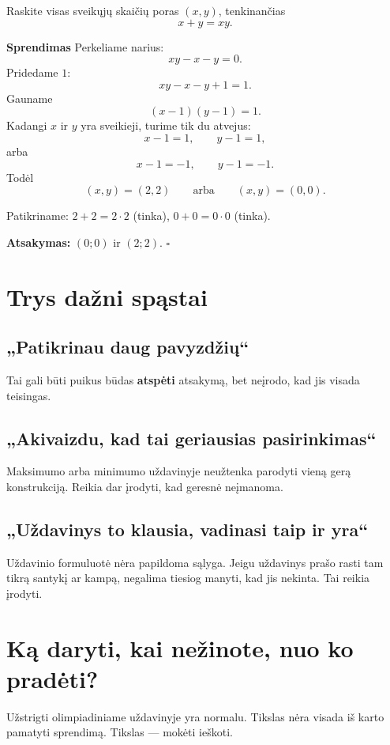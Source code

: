 \documentclass[11pt,a4paper]{scrartcl}
\newenvironment{solution}
    {\begin{list}{}{\setlength{\leftmargin}{10pt}\setlength{\rightmargin}{10pt}}\item[]}
    {\end{list}}
\begin{document}
\begin{example}
Raskite visas sveikųjų skaičių poras $(x,y)$, tenkinančias
\[
x+y=xy.
\]
\end{example}

\begin{solution}
\textbf{Sprendimas}
Perkeliame narius:
\[
xy-x-y=0.
\]
Pridedame $1$:
\[
xy-x-y+1=1.
\]
Gauname
\[
(x-1)(y-1)=1.
\]
Kadangi $x$ ir $y$ yra sveikieji, turime tik du atvejus:
\[
x-1=1,\qquad y-1=1,
\]
arba
\[
x-1=-1,\qquad y-1=-1.
\]
Todėl
\[
(x,y)=(2,2) \qquad\text{arba}\qquad (x,y)=(0,0).
\]

Patikriname: 
$2+2=2\cdot 2$ (tinka), $0+0=0\cdot 0$ (tinka).

\textbf{Atsakymas:} $\boxed{(0;0) \text{ ir } (2;2)}$. \hfill $\square$
\end{solution}

\section{Trys dažni spąstai}

\subsection{„Patikrinau daug pavyzdžių“}
Tai gali būti puikus būdas \textbf{atspėti} atsakymą, bet neįrodo, kad
jis visada teisingas.

\subsection{„Akivaizdu, kad tai geriausias pasirinkimas“}
Maksimumo arba minimumo uždavinyje neužtenka parodyti vieną gerą
konstrukciją. Reikia dar įrodyti, kad geresnė neįmanoma.

\subsection{„Uždavinys to klausia, vadinasi taip ir yra“}
Uždavinio formuluotė nėra papildoma sąlyga. Jeigu uždavinys prašo rasti
tam tikrą santykį ar kampą, negalima tiesiog manyti, kad jis nekinta.
Tai reikia įrodyti.

\section{Ką daryti, kai nežinote, nuo ko pradėti?}

Užstrigti olimpiadiniame uždavinyje yra normalu. Tikslas nėra visada iš
karto pamatyti sprendimą. Tikslas --- mokėti ieškoti.
\end{document}
